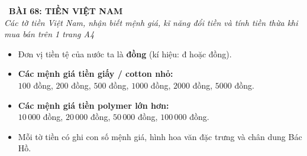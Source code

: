 \documentclass[11pt,a4paper]{article}
\begin{document}
\begin{tcolorbox}[
  enhanced,
  colback=white,
  colframe=primary,
  arc=3mm,
  boxrule=1.2pt,
  left=4mm, right=4mm, top=2.5mm, bottom=2.5mm,
  drop shadow=black!10!white
]
  \centering
  {\Large\bfseries\color{primary}\faBookmark\ BÀI 68: TIỀN VIỆT NAM}\\[1.5mm]
  {\small\itshape\color{black!75}Các tờ tiền Việt Nam, nhận biết mệnh giá, kĩ năng đổi tiền và tính tiền thừa khi mua bán trên 1 trang A4}
\end{tcolorbox}

\vspace{-2mm}


\noindent
\begin{minipage}[t]{0.49\textwidth}\vspace{0pt}
\begin{tcolorbox}[
  enhanced,
  colback=blue!4!white,
  colframe=blue!75!black,
  arc=2mm, boxrule=0.8pt,
  left=2mm, right=2mm, top=1.8mm, bottom=1.8mm,
  title={\footnotesize\bfseries\color{white}\faKey\ 1. Các mệnh giá Tiền Việt Nam}
]
{\footnotesize
\begin{itemize}\setlength{\itemsep}{1.5pt}\setlength{\leftskip}{-2.5mm}
  \item Đơn vị tiền tệ của nước ta là \textbf{đồng} (kí hiệu: đ hoặc đồng).
  \item \textbf{Các mệnh giá tiền giấy / cotton nhỏ:}\\
  $100$ đồng, $200$ đồng, $500$ đồng, $1000$ đồng, $2000$ đồng, $5000$ đồng.
  \item \textbf{Các mệnh giá tiền polymer lớn hơn:}\\
  $10\,000$ đồng, $20\,000$ đồng, $50\,000$ đồng, $100\,000$ đồng.
  \item Mỗi tờ tiền có ghi con số mệnh giá, hình hoa văn đặc trưng và chân dung Bác Hồ.
\end{itemize}
}
\end{tcolorbox}
\end{minipage}
\hfill
\end{document}
